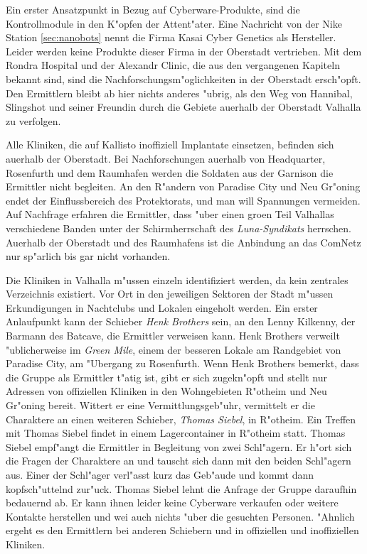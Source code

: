Ein erster Ansatzpunkt in Bezug auf Cyberware-Produkte, sind die Kontrollmodule in den K"opfen der Attent"ater. Eine Nachricht von der Nike Station \cref{sec:nanobots} nennt die Firma Kasai Cyber Genetics als Hersteller. Leider werden keine Produkte dieser Firma in der Oberstadt vertrieben. Mit dem Rondra Hospital und der Alexandr Clinic, die aus den vergangenen Kapiteln bekannt sind, sind die Nachforschungsm"oglichkeiten in der Oberstadt ersch"opft. Den Ermittlern bleibt ab hier nichts anderes "ubrig, als den Weg von Hannibal, Slingshot und seiner Freundin durch die Gebiete au\3erhalb der Oberstadt Valhalla zu verfolgen.

Alle Kliniken, die auf Kallisto inoffiziell Implantate einsetzen, befinden sich au\3erhalb der Oberstadt. Bei Nachforschungen au\3erhalb von Headquarter, Rosenfurth und dem Raumhafen werden die Soldaten aus der Garnison die Ermittler nicht begleiten. An den R"andern von Paradise City und Neu Gr"oning endet der Einflussbereich des Protektorats, und man will Spannungen vermeiden. Auf Nachfrage erfahren die Ermittler, dass "uber einen gro\3en Teil Valhallas verschiedene Banden unter der Schirmherrschaft des \emph{Luna-Syndikats} herrschen. Au\3erhalb der Oberstadt und des Raumhafens ist die Anbindung an das ComNetz nur sp"arlich bis gar nicht vorhanden.

Die Kliniken in Valhalla m"ussen einzeln identifiziert werden, da kein zentrales Verzeichnis existiert. Vor Ort in den jeweiligen Sektoren der Stadt m"ussen Erkundigungen in Nachtclubs und Lokalen eingeholt werden. Ein erster Anlaufpunkt kann der Schieber \emph{Henk Brothers} sein, an den Lenny Kilkenny, der Barmann des Batcave, die Ermittler verweisen kann. Henk Brothers verweilt "ublicherweise im \emph{Green Mile}, einem der besseren Lokale am Randgebiet von Paradise City, am "Ubergang zu Rosenfurth. Wenn Henk Brothers bemerkt, dass die Gruppe als Ermittler t"atig ist, gibt er sich zugekn"opft und stellt nur Adressen von offiziellen Kliniken in den Wohngebieten R"otheim und Neu Gr"oning bereit. Wittert er eine Vermittlungsgeb"uhr, vermittelt er die Charaktere an einen weiteren Schieber, \emph{Thomas Siebel}, in R"otheim. Ein Treffen mit Thomas Siebel findet in einem Lagercontainer in R"otheim statt. Thomas Siebel empf"angt die Ermittler in Begleitung von zwei Schl"agern. Er h"ort sich die Fragen der Charaktere an und tauscht sich dann mit den beiden Schl"agern aus. Einer der Schl"ager verl"asst kurz das Geb"aude und kommt dann kopfsch"uttelnd zur"uck. Thomas Siebel lehnt die Anfrage der Gruppe daraufhin bedauernd ab. Er kann ihnen leider keine Cyberware verkaufen oder weitere Kontakte herstellen und wei\3 auch nichts "uber die gesuchten Personen. "Ahnlich ergeht es den Ermittlern bei anderen Schiebern und in offiziellen und inoffiziellen Kliniken.

